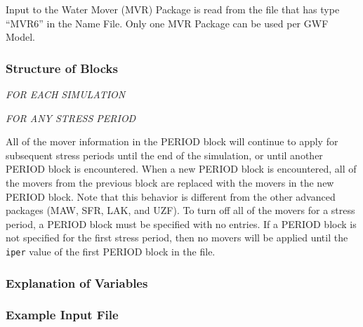 Input to the Water Mover (MVR) Package is read from the file that has type ``MVR6'' in the Name File.  Only one MVR Package can be used per GWF Model.

\vspace{5mm}
\subsubsection{Structure of Blocks}
\vspace{5mm}

\noindent \textit{FOR EACH SIMULATION}



\vspace{5mm}
\noindent \textit{FOR ANY STRESS PERIOD}

All of the mover information in the PERIOD block will continue to apply for subsequent stress periods until the end of the simulation, or until another PERIOD block is encountered.  When a new PERIOD block is encountered, all of the movers from the previous block are replaced with the movers in the new PERIOD block.  Note that this behavior is different from the other advanced packages (MAW, SFR, LAK, and UZF).  To turn off all of the movers for a stress period, a PERIOD block must be specified with no entries.  If a PERIOD block is not specified for the first stress period, then no movers will be applied until the \texttt{iper} value of the first PERIOD block in the file.


\vspace{5mm}
\subsubsection{Explanation of Variables}
\begin{description}

\end{description}

\vspace{5mm}
\subsubsection{Example Input File}

